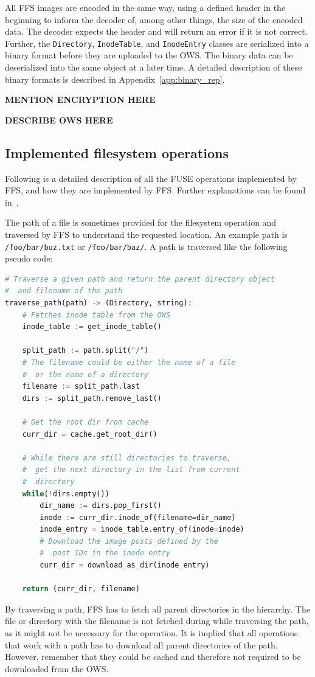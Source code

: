 All FFS images are encoded in the same way, using a defined header in the beginning to inform the decoder of, among other things, the size of the encoded data. The decoder expects the header and will return an error if it is not correct. Further, the \texttt{Directory}, \texttt{InodeTable}, and \texttt{InodeEntry} classes are serialized into a binary format before they are uploaded to the OWS. The binary data can be deserialized into the same object at a later time. A detailed description of these binary formats is described in Appendix~\ref{app:binary_rep}.

\textbf{MENTION ENCRYPTION HERE}


\textbf{DESCRIBE OWS HERE}


\subsection{Implemented filesystem operations}
\label{subsec:file_op}
Following is a detailed description of all the FUSE operations implemented by FFS, and how they are implemented by FFS. Further explanations can be found in \,\cite{kuenningCS135FUSEDocumentation2010}. 

The path of a file is sometimes provided for the filesystem operation and traversed by FFS to understand the requested location. An example path is \texttt{/foo/bar/buz.txt} or \texttt{/foo/bar/baz/}. A path is traversed like the following pseudo code:
\begin{lstlisting}[language=python, caption={Pseudocode of traversing a given path, returning the \texttt{Directory} and the filename}, label=lst:traverse_path,breaklines=true]
# Traverse a given path and return the parent directory object
#  and filename of the path
traverse_path(path) -> (Directory, string):
	# Fetches inode table from the OWS
	inode_table := get_inode_table()
	
	split_path := path.split("/")
	# The filename could be either the name of a file 
	#  or the name of a directory
	filename := split_path.last
	dirs := split_path.remove_last()

	# Get the root dir from cache
	curr_dir = cache.get_root_dir()

	# While there are still directories to traverse,
	#  get the next directory in the list from current
	#  directory
	while(!dirs.empty())
		dir_name := dirs.pop_first()
		inode := curr_dir.inode_of(filename=dir_name)
		inode_entry = inode_table.entry_of(inode=inode)
		# Download the image posts defined by the 
		#  post IDs in the inode entry
		curr_dir = download_as_dir(inode_entry)
	
	return (curr_dir, filename)

\end{lstlisting}
By traversing a path, FFS has to fetch all parent directories in the hierarchy. The file or directory with the filename is not fetched during while traversing the path, as it might not be necessary for the operation. It is implied that all operations that work with a path has to download all parent directories of the path. However, remember that they could be cached and therefore not required to be downloaded from the OWS.

